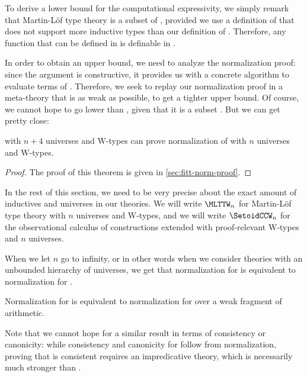 To derive a lower bound for the computational expressivity, we simply remark 
that Martin-Löf type theory is a subset of \SetoidCC, provided we use a 
definition of \MLTT that does not support more inductive types than our 
definition of \SetoidCC.
%
Therefore, any function that can be defined in \MLTT is definable in \SetoidCC.

In order to obtain an upper bound, we need to analyze the normalization proof:
since the argument is constructive, it provides us with a concrete algorithm to 
evaluate terms of \SetoidCC. 
% 
Therefore, we seek to replay our normalization proof in a meta-theory that is 
as weak as possible, to get a tighter upper bound. Of course, we cannot
hope to go lower than \MLTT, given that it is a subset \SetoidCC. But we
can get pretty close:

\begin{theorem}\label{setoidCC-in-MLTT}
  \MLTT with \( n + 4 \) universes and \( \mathrm{W} \)-types can prove normalization of 
  \SetoidCC with \( n \) universes and \( \mathrm{W} \)-types.
\end{theorem}
\begin{proof}
  The proof of this theorem is given in \cref{sec:fitt-norm-proof}.
\end{proof}

In the rest of this section, we need to be very precise about the exact
amount of inductives and universes in our theories.
We will write \( \MLTTW_n \) for Martin-Löf type 
theory with \( n \) universes and \( \mathrm{W} \)-types, and we will write
\( \SetoidCCW_n \) for the observational calculus of constructions extended 
with proof-relevant \( \mathrm{W} \)-types and \( n \) universes.

When we let \( n \) go to infinity, or in other words when we consider theories 
with an unbounded hierarchy of universes, we get that
normalization for \MLTTW is equivalent to normalization for \SetoidCCW.

\begin{corollary}
  Normalization for \SetoidCCW is equivalent to normalization for \MLTTW
  over a weak fragment of arithmetic.
\end{corollary}

Note that we cannot hope for a similar result in terms of consistency or
canonicity: while consistency and canonicity for \MLTTW follow from
normalization, proving that \SetoidCCW is consistent requires an impredicative
theory, which is necessarily much stronger than \MLTTW.

